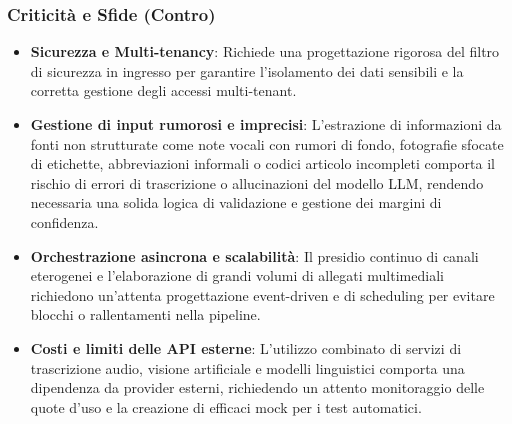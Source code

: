 \subsubsection{Criticità e Sfide (Contro)}
\begin{itemize}
    \item \textbf{Sicurezza e Multi-tenancy}: Richiede una progettazione rigorosa del filtro di sicurezza in ingresso per garantire l'isolamento dei dati sensibili e la corretta gestione degli accessi multi-tenant.

    \item \textbf{Gestione di input rumorosi e imprecisi}: L'estrazione di informazioni da fonti non strutturate come note vocali con rumori di fondo, fotografie sfocate di etichette, abbreviazioni informali o codici articolo incompleti comporta il rischio di errori di trascrizione o allucinazioni del modello LLM, rendendo necessaria una solida logica di validazione e gestione dei margini di confidenza.

    \item \textbf{Orchestrazione asincrona e scalabilità}:  Il presidio continuo di canali eterogenei e l'elaborazione di grandi volumi di allegati multimediali richiedono un'attenta progettazione event-driven e di scheduling per evitare blocchi o rallentamenti nella pipeline.

    \item \textbf{Costi e limiti delle API esterne}:  L'utilizzo combinato di servizi di trascrizione audio, visione artificiale e modelli linguistici comporta una dipendenza da provider esterni, richiedendo un attento monitoraggio delle quote d'uso e la creazione di efficaci mock per i test automatici.
\end{itemize}
